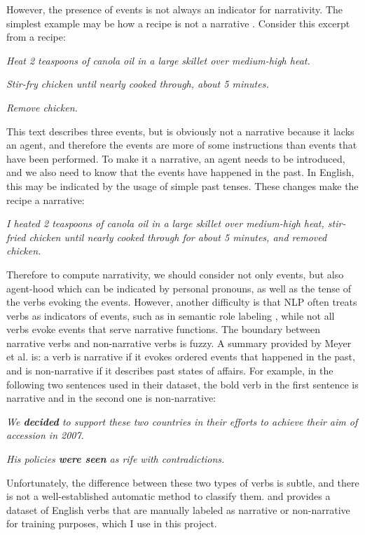 \documentclass[a4paper]{article}
\begin{document}
However, the presence of events is not always an indicator for narrativity. The simplest example may be how a recipe is not a narrative \cite{ryan2007toward}. Consider this excerpt from a recipe:

\emph{Heat 2 teaspoons of canola oil in a large skillet over medium-high heat. }

\emph{Stir-fry chicken until nearly cooked through, about 5 minutes. }

\emph{Remove chicken. }

This text describes three events, but is obviously not a narrative because it lacks an agent, and therefore the events are more of some instructions than events that have been performed. To make it a narrative, an agent needs to be introduced, and we also need to know that the events have happened in the past. In English, this may be indicated by the usage of simple past tenses. These changes make the recipe a narrative:

\emph{I heated 2 teaspoons of canola oil in a large skillet over medium-high heat, stir-fried chicken until nearly cooked through for about 5 minutes, and removed chicken.}

Therefore to compute narrativity, we should consider not only events, but also agent-hood which can be indicated by personal pronouns, as well as the tense of the verbs evoking the events. However, another difficulty is that NLP often treats verbs as indicators of events, such as in semantic role labeling \cite{palmer2010semantic}, while not all verbs evoke events that serve narrative functions. The boundary between narrative verbs and non-narrative verbs is fuzzy. A summary provided by Meyer et al. \cite{meyer2013detecting} is: a verb is narrative if it evokes ordered events that happened in the past, and is non-narrative if it describes past states of affairs. For example, in the following two sentences used in their dataset, the bold verb in the first sentence is narrative and in the second one is non-narrative:

\emph{We \textbf{decided} to support these two countries in their efforts to achieve their aim of accession in 2007.}

\emph{His policies \textbf{were seen} as rife with contradictions.}

Unfortunately, the difference between these two types of verbs is subtle, and there is not a well-established automatic method to classify them. \cite{meyer2013detecting} and \cite{grisot2014cross} provides a dataset of English verbs that are manually labeled as narrative or non-narrative for training purposes, which I use in this project.
\end{document}
